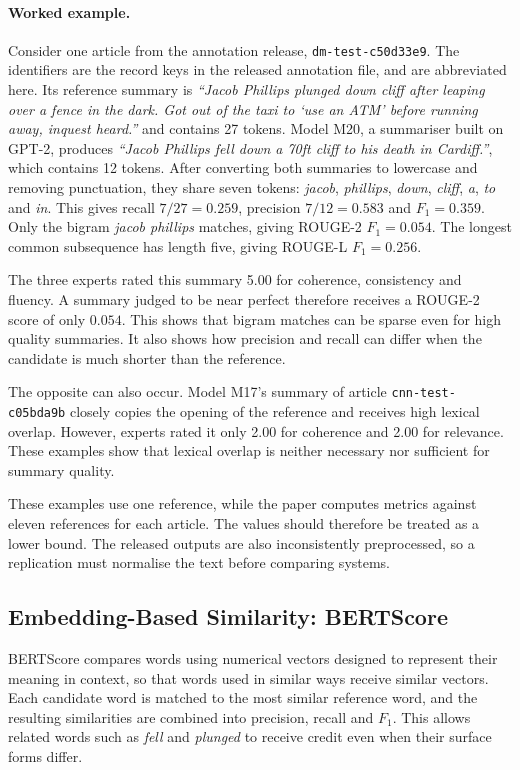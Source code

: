 \documentclass[11pt]{article}
\begin{document}
\paragraph{Worked example.}
Consider one article from the annotation release, \texttt{dm-test-c50d33e9}. The identifiers are the record keys in the released annotation file, and are abbreviated here. Its reference summary is \textit{``Jacob Phillips plunged down cliff after leaping over a fence in the dark. Got out of the taxi to `use an ATM' before running away, inquest heard.''} and contains 27 tokens. Model M20, a summariser built on GPT-2, produces \textit{``Jacob Phillips fell down a 70ft cliff to his death in Cardiff.''}, which contains 12 tokens. After converting both summaries to lowercase and removing punctuation, they share seven tokens: \textit{jacob}, \textit{phillips}, \textit{down}, \textit{cliff}, \textit{a}, \textit{to} and \textit{in}. This gives recall $7/27 = 0.259$, precision $7/12 = 0.583$ and $F_1 = 0.359$. Only the bigram \textit{jacob phillips} matches, giving ROUGE-2 $F_1 = 0.054$. The longest common subsequence has length five, giving ROUGE-L $F_1 = 0.256$.

The three experts rated this summary 5.00 for coherence, consistency and fluency. A summary judged to be near perfect therefore receives a ROUGE-2 score of only $0.054$. This shows that bigram matches can be sparse even for high quality summaries. It also shows how precision and recall can differ when the candidate is much shorter than the reference.

The opposite can also occur. Model M17's summary of article \texttt{cnn-test-c05bda9b} closely copies the opening of the reference and receives high lexical overlap. However, experts rated it only 2.00 for coherence and 2.00 for relevance. These examples show that lexical overlap is neither necessary nor sufficient for summary quality.

These examples use one reference, while the paper computes metrics against eleven references for each article. The values should therefore be treated as a lower bound. The released outputs are also inconsistently preprocessed, so a replication must normalise the text before comparing systems.

\subsection{Embedding-Based Similarity: BERTScore}
\label{sec:bertscore}

BERTScore \citep{zhang-etal-2020-bertscore} compares words using numerical vectors designed to represent their meaning in context, so that words used in similar ways receive similar vectors. Each candidate word is matched to the most similar reference word, and the resulting similarities are combined into precision, recall and $F_1$. This allows related words such as \textit{fell} and \textit{plunged} to receive credit even when their surface forms differ.
\end{document}
